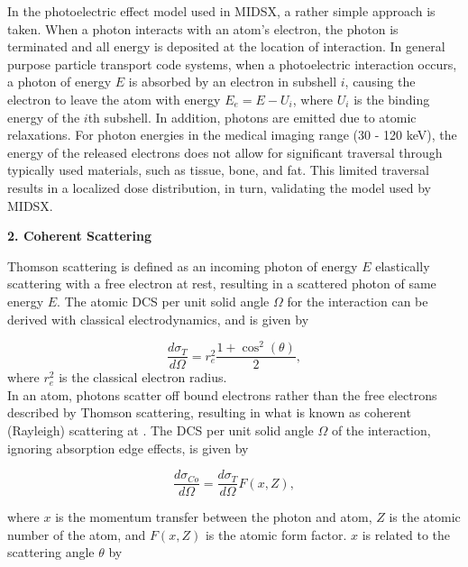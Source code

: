 \documentclass[%
 aip,
cp,  %
 amsmath,amssymb,%
reprint,%
]{revtex4-2}
\begin{document}
\par In the photoelectric effect model used in MIDSX, a rather simple approach is taken. When a photon interacts with an atom's electron, the photon is terminated and all energy is deposited at the location of interaction. In general purpose particle transport code systems, when a photoelectric interaction occurs, a photon of energy $E$ is absorbed by an electron in subshell $i$, causing the electron to leave the atom with energy $E_e = E - U_i$, where $U_i$ is the binding energy of the $i$th subshell. In addition, photons are emitted due to atomic relaxations. For photon energies in the medical imaging range (30 - 120 keV), the energy of the released electrons does not allow for significant traversal through typically used materials, such as tissue, bone, and fat. This limited traversal results in a localized dose distribution, in turn, validating the model used by MIDSX. \\

\begin{large}
    \bf{2. Coherent Scattering}
\end{large}

\par Thomson scattering is defined as an incoming photon of energy $E$ elastically scattering with a free electron at rest, resulting in a scattered photon of same energy $E$. The atomic DCS per unit solid angle $\Omega$ for the interaction can be derived with classical electrodynamics, and is given by

\begin{equation}
    \frac{d\sigma_T}{d\Omega} = r_e^2 \frac{1 + \cos^2(\theta)}{2},
\end{equation}
where $r_e^2$ is the classical electron radius. \\
In an atom, photons scatter off bound electrons rather than the free electrons described by Thomson scattering, resulting in what is known as coherent (Rayleigh) scattering at . The DCS per unit solid angle $\Omega$ of the interaction, ignoring absorption edge effects, is given by

\begin{equation}
    \frac{d\sigma_{Co}}{d\Omega} = \frac{d\sigma_T}{d\Omega} F(x, Z),
\end{equation}

where $x$ is the momentum transfer between the photon and atom, $Z$ is the atomic number of the atom, and $F(x, Z)$ is the atomic form factor. $x$ is related to the scattering angle $\theta$ by
\end{document}
